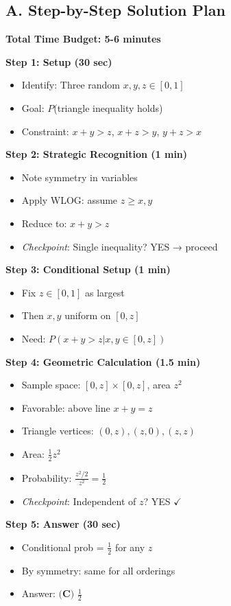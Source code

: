 \documentclass[11pt]{article}
\begin{document}
\begin{roadmapbox}
\subsection*{A. Step-by-Step Solution Plan}

\textbf{Total Time Budget: 5-6 minutes}

\textbf{Step 1: Setup (30 sec)}
\begin{itemize}
    \item Identify: Three random $x, y, z \in [0,1]$
    \item Goal: $P$(triangle inequality holds)
    \item Constraint: $x+y>z$, $x+z>y$, $y+z>x$
\end{itemize}

\textbf{Step 2: Strategic Recognition (1 min)}
\begin{itemize}
    \item Note symmetry in variables
    \item Apply WLOG: assume $z \geq x, y$
    \item Reduce to: $x+y>z$
    \item \textit{Checkpoint}: Single inequality? YES → proceed
\end{itemize}

\textbf{Step 3: Conditional Setup (1 min)}
\begin{itemize}
    \item Fix $z \in [0,1]$ as largest
    \item Then $x, y$ uniform on $[0,z]$
    \item Need: $P(x+y>z | x,y \in [0,z])$
\end{itemize}

\textbf{Step 4: Geometric Calculation (1.5 min)}
\begin{itemize}
    \item Sample space: $[0,z] \times [0,z]$, area $z^2$
    \item Favorable: above line $x+y=z$
    \item Triangle vertices: $(0,z), (z,0), (z,z)$
    \item Area: $\frac{1}{2}z^2$
    \item Probability: $\frac{z^2/2}{z^2} = \frac{1}{2}$
    \item \textit{Checkpoint}: Independent of $z$? YES $\checkmark$
\end{itemize}

\textbf{Step 5: Answer (30 sec)}
\begin{itemize}
    \item Conditional prob = $\frac{1}{2}$ for any $z$
    \item By symmetry: same for all orderings
    \item Answer: $\boxed{\textbf{(C) } \frac{1}{2}}$
\end{itemize}


\end{roadmapbox}
\end{document}
